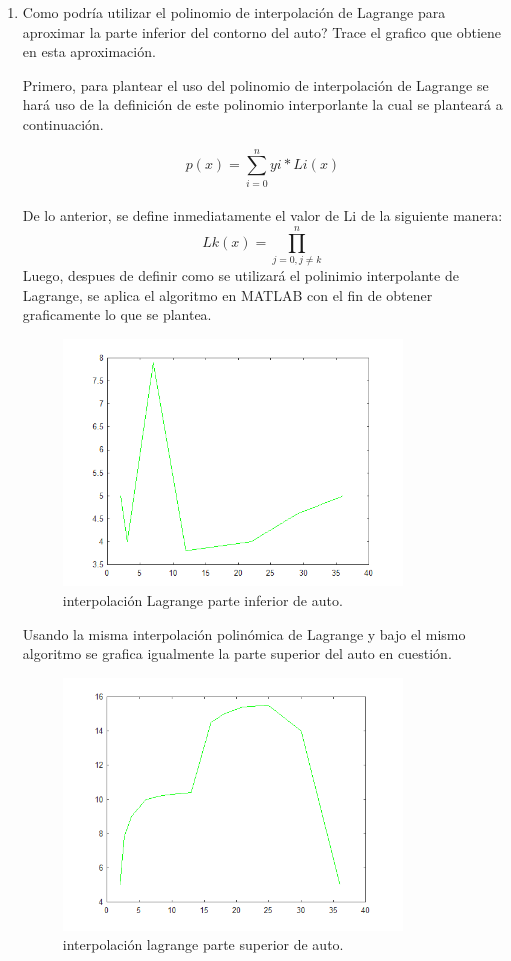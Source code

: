 \documentclass{udpreport}
\begin{document}
\begin{enumerate}
\item Como podría utilizar el polinomio de interpolación de Lagrange para aproximar la parte inferior del contorno del auto? Trace el grafico que obtiene en esta aproximación.

Primero, para plantear el uso del polinomio de interpolación de Lagrange se hará uso de la definición de este polinomio interporlante la cual se planteará a continuación.

 \begin{equation}
 p(x)=\sum_{i=0}^n yi*Li(x)
\end{equation}
\\ De lo anterior, se define inmediatamente el valor de Li de la siguiente manera:
 \begin{equation}
 Lk(x)=\prod_{j=0,j\not=k}^{n}
\end{equation}
Luego, despues de definir como se utilizará el polinimio interpolante de Lagrange, se aplica el algoritmo en MATLAB con el fin de obtener graficamente lo que se plantea. 
\begin{figure}[H]
    \centering
    \includegraphics[width=9cm]{int_lagrange_inf}
    \caption{interpolación Lagrange parte inferior de auto.} \label{fig:int_lagrange_inf}
\end{figure}
Usando la misma interpolación polinómica de Lagrange y bajo el mismo algoritmo se grafica igualmente la parte superior del auto en cuestión.
\begin{figure}[H]
    \centering
    \includegraphics[width=9cm]{int_lagrange_aprox_parte_sup}
    \caption{interpolación lagrange parte superior de auto.} \label{fig:int_lagrange_aprox_parte_sup}
\end{figure}


\end{enumerate}
\end{document}
